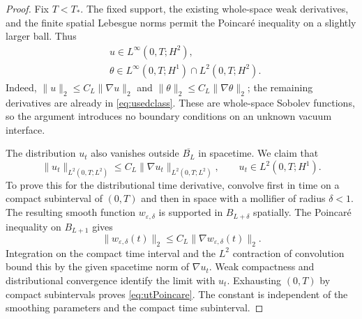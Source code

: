 \documentclass[10pt,twoside]{article}
\newcommand{\norm}[2]{\lVert#1\rVert_{#2}}
\begin{document}
\begin{proof}
Fix $T<T_*$. The fixed support, the existing whole-space weak
derivatives, and the finite spatial Lebesgue norms permit the
Poincar\'e inequality on a slightly larger ball. Thus
\begin{equation}
 \begin{aligned}
 &u\in L^\infty(0,T;H^2),\\
 &\theta\in L^\infty(0,T;H^1)\cap L^2(0,T;H^2).
 \end{aligned}\label{eq:compactSobolev}
\end{equation}
Indeed,
$\norm{u}{2}\le C_L\norm{\nabla u}{2}$ and
$\norm{\theta}{2}\le C_L\norm{\nabla\theta}{2}$; the remaining
derivatives are already in \eqref{eq:usedclass}. These are
whole-space Sobolev functions, so the argument introduces no
boundary conditions on an unknown vacuum interface.

The distribution $u_t$ also vanishes outside $\overline{B_L}$ in
spacetime. We claim that
\begin{equation}
 \norm{u_t}{L^2(0,T;L^2)}
       \le C_L\norm{\nabla u_t}{L^2(0,T;L^2)},
 \qquad u_t\in L^2(0,T;H^1).
 \label{eq:utPoincare}
\end{equation}
To prove this for the distributional time derivative, convolve
first in time on a compact subinterval of $(0,T)$ and then in space
with a mollifier of radius $\delta<1$. The resulting smooth function
$w_{\varepsilon,\delta}$ is supported in $B_{L+\delta}$ spatially.
The Poincar\'e inequality on $B_{L+1}$ gives
\[
 \norm{w_{\varepsilon,\delta}(t)}{2}
       \le C_L\norm{\nabla w_{\varepsilon,\delta}(t)}{2}.
\]
Integration on the compact time interval and the $L^2$ contraction
of convolution bound this by the given spacetime norm of $\nabla u_t$.
Weak compactness and distributional convergence identify the limit
with $u_t$. Exhausting $(0,T)$ by compact subintervals proves
\eqref{eq:utPoincare}. The constant is independent of the smoothing
parameters and the compact time subinterval.


\end{proof}
\end{document}
